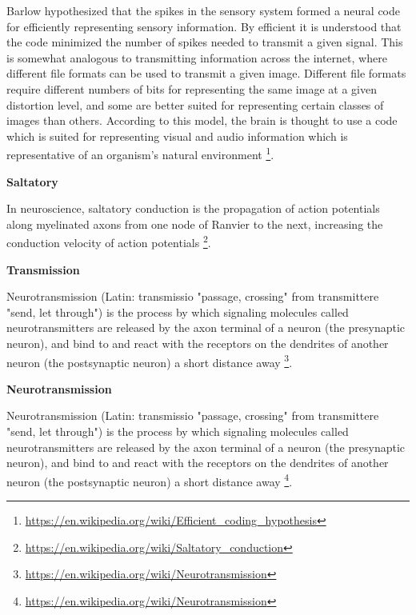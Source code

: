 \documentclass{book}
\providecommand{\ProjectDeepHeading}[2]{%
    \par\medskip\noindent\textbf{#2}\par\smallskip
}
\providecommand{\seeherefooter}[1]{\footnote{\url{#1}}}
\begin{document}
    Barlow hypothesized that the spikes in the sensory system formed a neural code for efficiently representing sensory information. By efficient it is understood that the code minimized the number of spikes needed to transmit a given signal. This is somewhat analogous to transmitting information across the internet, where different file formats can be used to transmit a given image. Different file formats require different numbers of bits for representing the same image at a given distortion level, and some are better suited for representing certain classes of images than others. According to this model, the brain is thought to use a code which is suited for representing visual and audio information which is representative of an organism's natural environment \seeherefooter{https://en.wikipedia.org/wiki/Efficient_coding_hypothesis}.
%    
%

\ProjectDeepHeading{4}{Saltatory}


In neuroscience, saltatory conduction is the propagation of action potentials along myelinated axons from one node of Ranvier to the next, increasing the conduction velocity of action potentials \seeherefooter{https://en.wikipedia.org/wiki/Saltatory_conduction}.

\ProjectDeepHeading{4}{Transmission}


Neurotransmission (Latin: transmissio "passage, crossing" from transmittere "send, let through") is the process by which signaling molecules called neurotransmitters are released by the axon terminal of a neuron (the presynaptic neuron), and bind to and react with the receptors on the dendrites of another neuron (the postsynaptic neuron) a short distance away \seeherefooter{https://en.wikipedia.org/wiki/Neurotransmission}.

\ProjectDeepHeading{3}{Neurotransmission}


Neurotransmission (Latin: transmissio "passage, crossing" from transmittere "send, let through") is the process by which signaling molecules called neurotransmitters are released by the axon terminal of a neuron (the presynaptic neuron), and bind to and react with the receptors on the dendrites of another neuron (the postsynaptic neuron) a short distance away \seeherefooter{https://en.wikipedia.org/wiki/Neurotransmission}.
\end{document}
